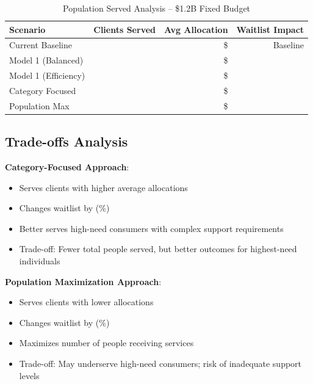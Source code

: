 \begin{table}[h]
\centering
\caption{Population Served Analysis -- \$1.2B Fixed Budget}
\begin{tabular}{lrrr}
\toprule
\textbf{Scenario} & \textbf{Clients Served} & \textbf{Avg Allocation} & \textbf{Waitlist Impact} \\
\midrule
Current Baseline & \ModelOnePopcurrentbaselineClients{} & \$\ModelOnePopcurrentbaselineAvgAlloc{} & Baseline \\
Model 1 (Balanced) & \ModelOnePopmodelbalancedClients{} & \$\ModelOnePopmodelbalancedAvgAlloc{} & \ModelOnePopmodelbalancedWaitlistChange{} \\
Model 1 (Efficiency) & \ModelOnePopmodelefficiencyClients{} & \$\ModelOnePopmodelefficiencyAvgAlloc{} & \ModelOnePopmodelefficiencyWaitlistChange{} \\
Category Focused & \ModelOnePopcategoryfocusedClients{} & \$\ModelOnePopcategoryfocusedAvgAlloc{} & \ModelOnePopcategoryfocusedWaitlistChange{} \\
Population Max & \ModelOnePoppopulationmaximizedClients{} & \$\ModelOnePoppopulationmaximizedAvgAlloc{} & \ModelOnePoppopulationmaximizedWaitlistChange{} \\
\bottomrule
\end{tabular}
\end{table}

\subsection{Trade-offs Analysis}

\textbf{Category-Focused Approach}:
\begin{itemize}
    \item Serves \ModelOnePopcategoryfocusedClients{} clients with higher average allocations
    \item Changes waitlist by \ModelOnePopcategoryfocusedWaitlistChange{} (\ModelOnePopcategoryfocusedWaitlistPct{}\%)
    \item Better serves high-need consumers with complex support requirements
    \item Trade-off: Fewer total people served, but better outcomes for highest-need individuals
\end{itemize}

\textbf{Population Maximization Approach}:
\begin{itemize}
    \item Serves \ModelOnePoppopulationmaximizedClients{} clients with lower allocations
    \item Changes waitlist by \ModelOnePoppopulationmaximizedWaitlistChange{} (\ModelOnePoppopulationmaximizedWaitlistPct{}\%)
    \item Maximizes number of people receiving services
    \item Trade-off: May underserve high-need consumers; risk of inadequate support levels
\end{itemize}


